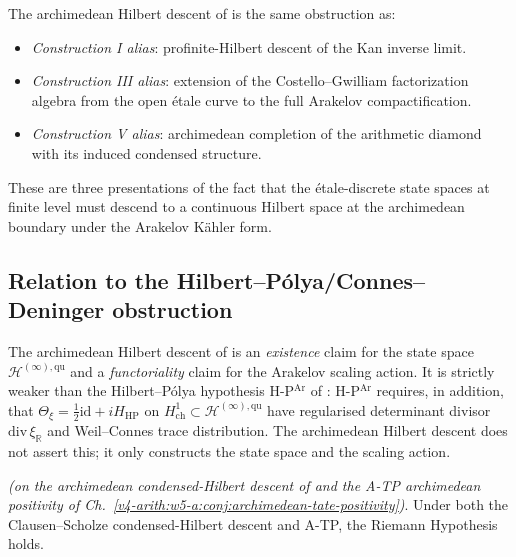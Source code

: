 \begin{remark}
\label{v4-arith:w10-a:rem:aliases}
The archimedean Hilbert descent of
 is the same obstruction as:
\begin{itemize}
\item \emph{Construction I alias}: profinite-Hilbert descent of the Kan
inverse limit.
\item \emph{Construction III alias}: extension of the Costello--Gwilliam
factorization algebra from the open \'etale curve to the full
Arakelov compactification.
\item \emph{Construction V alias}: archimedean completion of the arithmetic
diamond with its induced condensed structure.
\end{itemize}
These are three presentations of the fact that the
\'etale-discrete state spaces at finite level must descend to a
continuous Hilbert space at the archimedean boundary under the
Arakelov K\"ahler form.
\end{remark}

\subsection{Relation to the Hilbert--P\'olya/Connes--Deninger obstruction}
\label{v4-arith:w10-a:HP-relation}

\begin{remark}
\label{v4-arith:w10-a:rem:weaker-than-RH}
The archimedean Hilbert descent of
 is an \emph{existence}
claim for the state space \(\mathcal H^{(\infty),\mathrm{qu}}\) and a
\emph{functoriality} claim for the Arakelov scaling action. It is
strictly weaker than the Hilbert--P\'olya hypothesis
H-P\(^{\mathrm{Ar}}\) of : H-P\(^{\mathrm{Ar}}\)
requires, in addition, that
\(\Theta_{\xi}=\frac12\mathrm{id}+iH_{\mathrm{HP}}\) on
\(H^{1}_{\mathrm{ch}}\subset\mathcal H^{(\infty),\mathrm{qu}}\) have
regularised determinant divisor \(\mathrm{div}\,\xi_{\mathbb R}\) and
Weil--Connes trace distribution. The archimedean Hilbert
descent does not assert this; it only constructs the state space
and the scaling action.
\end{remark}

\begin{theorem}
\label{v4-arith:w10-a:thm:descent-plus-ATP-equals-RH}
\ClaimStatusProvedHereConditional \emph{(on the archimedean
condensed-Hilbert descent of
 and the
A-TP archimedean positivity of
Ch.~\ref{v4-arith:w5-a:conj:archimedean-tate-positivity})}. Under
both the Clausen--Scholze condensed-Hilbert descent and A-TP, the Riemann
Hypothesis holds.
\end{theorem}

